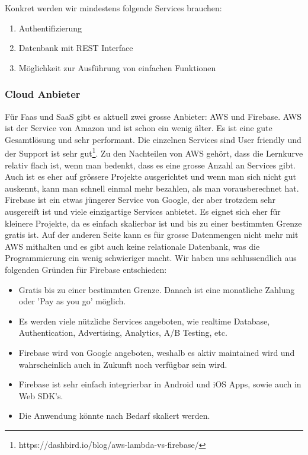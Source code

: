 \newpage
Konkret werden wir mindestens folgende Services brauchen:
\begin{enumerate}
    \item Authentifizierung
    \item Datenbank mit REST Interface
    \item Möglichkeit zur Ausführung von einfachen Funktionen
\end{enumerate}

\subsubsection{Cloud Anbieter}
Für Faas und SaaS gibt es aktuell zwei grosse Anbieter: AWS und Firebase. AWS ist der Service von Amazon und ist schon ein wenig älter. Es ist eine gute Gesamtlösung und sehr performant. Die einzelnen Services sind User friendly und der Support ist sehr gut\footnote{https://dashbird.io/blog/aws-lambda-vs-firebase/}. Zu den Nachteilen von AWS gehört, dass die Lernkurve relativ flach ist, wenn man bedenkt, dass es eine grosse Anzahl an Services gibt. Auch ist es eher auf grössere Projekte ausgerichtet und wenn man sich nicht gut auskennt, kann man schnell einmal mehr bezahlen, als man vorausberechnet hat.
Firebase ist ein etwas jüngerer Service von Google, der aber trotzdem sehr ausgereift ist und viele einzigartige Services anbietet. Es eignet sich eher für kleinere Projekte, da es einfach skalierbar ist und bis zu einer bestimmten Grenze gratis ist. Auf der anderen Seite kann es für grosse Datenmengen nicht mehr mit AWS mithalten und es gibt auch keine relationale Datenbank, was die Programmierung ein wenig schwieriger macht.
Wir haben uns schlussendlich aus folgenden Gründen für Firebase entschieden:
\begin{itemize}
    \item Gratis bis zu einer bestimmten Grenze. Danach ist eine monatliche Zahlung oder 'Pay as you go' möglich.
    \item Es werden viele nützliche Services angeboten, wie realtime Database, Authentication, Advertising, Analytics, A/B Testing, etc.
    \item Firebase wird von Google angeboten, weshalb es aktiv maintained wird und wahrscheinlich auch in Zukunft noch verfügbar sein wird.
    \item Firebase ist sehr einfach integrierbar in Android und iOS Apps, sowie auch in Web SDK's.
    \item Die Anwendung könnte nach Bedarf skaliert werden.
\end{itemize}

